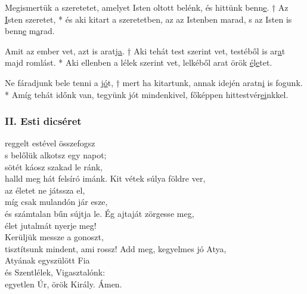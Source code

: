 \documentclass[twoside]{article}
\begin{document}
Megismertük a szeretetet, amelyet Isten oltott belénk, és hittünk benn\underline{e}. † Az \underline{I}sten szeretet, * és aki kitart a szeretetben, az az Istenben marad, s az Isten is benn\underline{e} m\underline{a}rad.

Amit az ember vet, azt is aratj\underline{a}. † Aki tehát test szerint vet, testéből is ar\underline{a}t majd romlást. * Aki ellenben a lélek szerint vet, lelkéből arat örök \underline{é}l\underline{e}tet.

Ne fáradjunk bele tenni a j\underline{ó}t, † mert ha kitartunk, annak idején aratn\underline{i} is fogunk. * Amíg tehát időnk van, tegyünk jót mindenkivel, főképpen hittestvér\underline{ei}nkkel.


\subsubsection*{II. Esti dicséret}

\begin{hymnstanzas}
    reggelt estével összefogsz\\
    s belőlük alkotsz egy napot;\\
    sötét káosz szakad le ránk,\\
    halld meg hát felsíró imánk.
\stanzabreak
    Kit vétek súlya földre ver,\\
    az életet ne játssza el,\\
    míg csak mulandón jár esze,\\
    és számtalan bűn sújtja le.
\stanzabreak
    Ég ajtaját zörgesse meg,\\
    élet jutalmát nyerje meg!\\
    Kerüljük messze a gonoszt,\\
    tisztítsunk mindent, ami rossz!
\stanzabreak
    Add meg, kegyelmes jó Atya,\\
    Atyának egyszülött Fia\\
    és Szentlélek, Vigasztalónk:\\
    egyetlen Úr, örök Király. Ámen.
\end{hymnstanzas}
\end{document}
